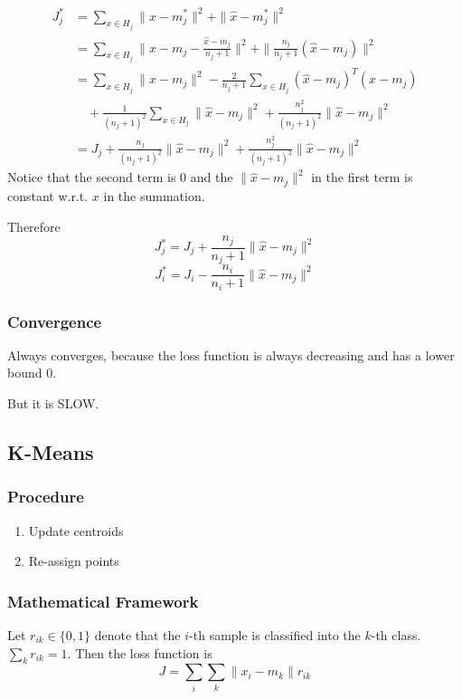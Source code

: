         \begin{align*}
            J_j^* &= \sum_{x\in H_j}\| x-m_j^* \|^2 + \| \hat{x} - m_j^* \|^2\\
            &= \sum_{x\in H_j}\|x-m_j-\frac{\hat{x}-m_j}{n_j+1}\|^2 + \| \frac{n_j}{n_j+1}(\hat{x}-m_j) \|^2\\
            &= \sum_{x\in H_j} \| x - m_j \|^2 - \frac{2}{n_j+1}\sum_{x\in H_j}(\hat{x}-m_j)^T(x-m_j)\\
            &\quad + \frac{1}{(n_j+1)^2}\sum_{x\in H_j}\| \hat{x} -m_j \|^2 + \frac{n_j^2}{(n_j+1)^2}\|\hat{x}-m_j\|^2\\
            &= J_j + \frac{n_j}{(n_j+1)^2}\|\hat{x}-m_j\|^2 + \frac{n_j^2}{(n_j+1)^2}\|\hat{x}-m_j\|^2
        \end{align*}
        Notice that the second term is $0$ and the $\|\hat{x}-m_j\|^2$ in the first term is constant w.r.t. $x$ in the summation.

        Therefore
        \[ J^*_j = J_j + \frac{n_j}{n_j+1}\|\hat{x}-m_j\|^2 \]
        \[ J^*_i = J_i - \frac{n_i}{n_i+1}\|\hat{x}-m_j\|^2 \]

        \subsubsection{Convergence}
        Always converges, because the loss function is always decreasing and has a lower bound $0$.

        But it is SLOW.

    \subsection{K-Means}
        \subsubsection{Procedure}
        \begin{enumerate}
            \item Update centroids
            \item Re-assign points
        \end{enumerate}

        \subsubsection{Mathematical Framework}
        Let $r_{ik} \in \{0,1\}$ denote that the $i$-th sample is classified into the $k$-th class. $\sum_kr_{ik} = 1$. Then the loss function is
        \[ J = \sum_i \sum_k \| x_i - m_k \|r_{ik} \]

